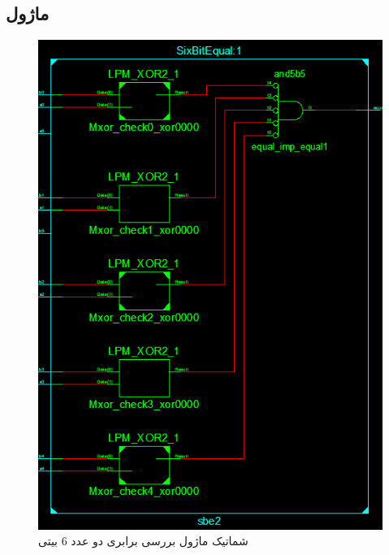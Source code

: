\documentclass[fleqn]{article}
\begin{document}
\subsection{ماژول }
\begin{figure}[H]
	\centering
	\includegraphics[width=.5\paperwidth]{./Schematic/SBE.png}
	\caption{شماتیک ماژول بررسی برابری دو عدد 6 بیتی}
	\label{sbe}
\end{figure}
\end{document}
